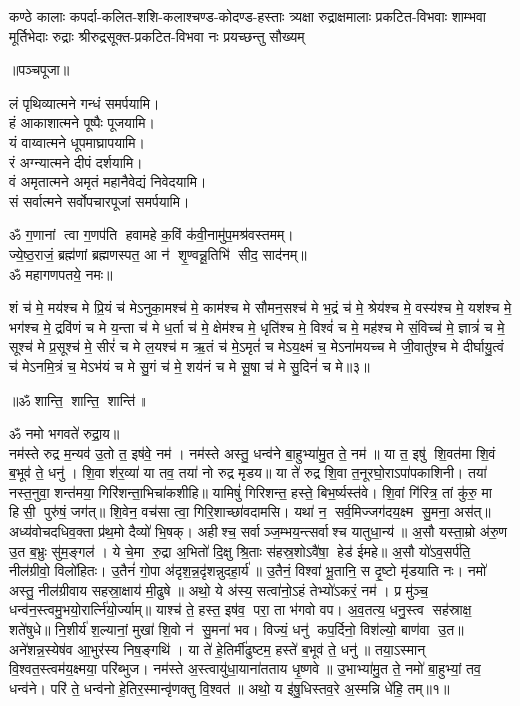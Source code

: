 {कण्ठे कालाः कपर्दा-कलित-शशि-कलाश्चण्ड-कोदण्ड-हस्ताः}
{त्र्यक्षा रुद्राक्षमालाः प्रकटित-विभवाः शाम्भवा मूर्तिभेदाः}
{रुद्राः श्रीरुद्रसूक्त-प्रकटित-विभवा नः प्रयच्छन्तु सौख्यम्}

\centerline{॥पञ्चपूजा॥}

लं पृथिव्यात्मने गन्धं समर्पयामि।\\
हं आकाशात्मने पूष्पैः पूजयामि।\\
यं वाय्वात्मने धूपमाघ्रापयामि।\\
रं अग्न्यात्मने दीपं दर्शयामि।\\
वं अमृतात्मने अमृतं महानैवेद्यं निवेदयामि।\\
सं सर्वात्मने सर्वोपचारपूजां समर्पयामि।

ॐ ग॒णानां त्वा ग॒णप॑ति हवामहे क॒विं क॑वी॒नामु॑प॒\-मश्र॑वस्तमम्। \\
ज्ये॒ष्ठ॒राजं॒ ब्रह्म॑णां ब्रह्मणस्पत॒ आ न॑ शृ॒ण्वन्नू॒तिभि॑ सीद॒ साद॑नम्॥ \\
ॐ महागणपतये॒ नमः॥ 


शं च॑ मे॒ मय॑श्च मे प्रि॒यं च॑ मेऽनुका॒मश्च॑ मे॒ काम॑श्च मे सौमन॒सश्च॑ मे भ॒द्रं च॑ मे॒ श्रेय॑श्च मे॒ वस्य॑श्च मे॒ यश॑श्च मे॒ भग॑श्च मे॒ द्रवि॑णं च मे य॒न्ता च॑ मे ध॒र्ता च॑ मे॒ क्षेम॑श्च मे॒ धृति॑श्च मे॒ विश्वं॑ च मे॒ मह॑श्च मे सं॒विच्च॑ मे॒ ज्ञात्रं॑ च मे॒ सूश्च॑ मे प्र॒सूश्च॑ मे॒ सीरं॑ च मे ल॒यश्च॑ म ऋ॒तं च॑ मे॒ऽमृतं॑ च मेऽय॒क्ष्मं च॒ मेऽना॑मयच्च मे जी॒वातु॑श्च मे दीर्घायु॒त्वं च॑ मेऽनमि॒त्रं च॒ मेऽभ॑यं च मे सु॒गं च॑ मे॒ शय॑नं च मे सू॒षा च॑ मे सु॒दिनं॑ च मे॥३॥ 
\centerline{॥ॐ शान्ति॒ शान्ति॒ शान्ति॑॥}

{\small \closesection}



ॐ नमो भगवते॑ रुद्रा॒य॥\\
 नम॑स्ते रुद्र म॒न्यव॑ उ॒तो त॒ इष॑वे॒ नम॑। नम॑स्ते अस्तु॒ धन्व॑ने बा॒हुभ्या॑मु॒त ते॒ नम॑॥ या त॒ इषु॑ शि॒वत॑मा शि॒वं ब॒भूव॑ ते॒ धनु॑। शि॒वा श॑र॒व्या॑ या तव॒ तया॑ नो रुद्र मृडय॥ या ते॑ रुद्र शि॒वा त॒नूरघो॒राऽपा॑पकाशिनी। तया॑ नस्त॒नुवा॒ शन्त॑मया॒ गिरि॑शन्ता॒\-भिचा॑कशीहि॥ यामिषुं॑ गिरिशन्त॒ हस्ते॒ बिभ॒र्ष्यस्त॑वे। शि॒वां गि॑रित्र॒ तां कु॑रु॒ मा हिसी॒ पुरु॑षं॒ जग॑त्॥ शि॒वेन॒ वच॑सा त्वा॒ गिरि॒शाच्छा॑वदामसि। यथा॑ न॒ सर्व॒मिज्जग॑दय॒क्ष्म सु॒मना॒ अस॑त्॥ अध्य॑वोचदधिव॒क्ता प्र॑थ॒मो दैव्यो॑ भि॒षक्।  अहीश्च॒ सर्वाञ्ज॒म्भय॒न्त्सर्वाश्च यातुधा॒न्य॑॥ अ॒सौ यस्ता॒म्रो अ॑रु॒ण उ॒त ब॒भ्रुः सु॑म॒ङ्गल॑। ये चे॒मा रु॒द्रा अ॒भितो॑ दि॒क्षु श्रि॒ताः स॑हस्र॒शोऽवै॑षा॒ हेड॑ ईमहे॥ अ॒सौ यो॑ऽव॒सर्प॑ति॒ नील॑ग्रीवो॒ विलो॑हितः। उ॒तैनं॑ गो॒पा अ॑दृश॒न्न॒दृ॑शन्नुदहा॒र्य॑॥ उ॒तैनं॒ विश्वा॑ भू॒तानि॒ स दृ॒ष्टो मृ॑डयाति नः। नमो॑ अस्तु॒ नील॑ग्रीवाय सहस्रा॒क्षाय॑ मी॒ढुषे॥ अथो॒ ये अ॑स्य॒ सत्वा॑नो॒ऽहं तेभ्यो॑ऽकरं॒ नम॑। प्र मु॑ञ्च॒ धन्व॑न॒स्त्वमु॒भयो॒रार्त्नि॑यो॒र्ज्याम्॥ याश्च॑ ते॒ हस्त॒ इष॑व॒ परा॒ ता भ॑गवो वप। अ॒व॒तत्य॒ धनु॒स्त्व सह॑स्राक्ष॒ शते॑षुधे॥ नि॒शीर्य॑ श॒ल्यानां॒ मुखा॑ शि॒वो न॑ सु॒मना॑ भव। विज्यं॒ धनु॑ कप॒र्दिनो॒ विश॑ल्यो॒ बाण॑वा उ॒त॥
 अने॑शन्न॒\-स्येष॑व आ॒भुर॑स्य निष॒ङ्गथि॑। या ते॑ हे॒तिर्मी॑ढुष्टम॒ हस्ते॑ ब॒भूव॑ ते॒ धनु॑॥ तया॒ऽस्मान् वि॒श्वत॒स्त्वम॑य॒क्ष्मया॒ परि॑ब्भुज। नम॑स्ते अ॒स्त्वायु॑धा॒याना॑तताय धृ॒ष्णवे॥ उ॒भाभ्या॑मु॒त ते॒ नमो॑ बा॒हुभ्यां॒ तव॒ धन्व॑ने। परि॑ ते॒ धन्व॑नो हे॒तिर॒स्मान्वृ॑णक्तु वि॒श्वत॑॥ अथो॒ य इ॑षु॒धिस्तव॒\aav{}\aav{}रे अ॒स्मन्नि धे॑हि॒ तम्॥१॥

